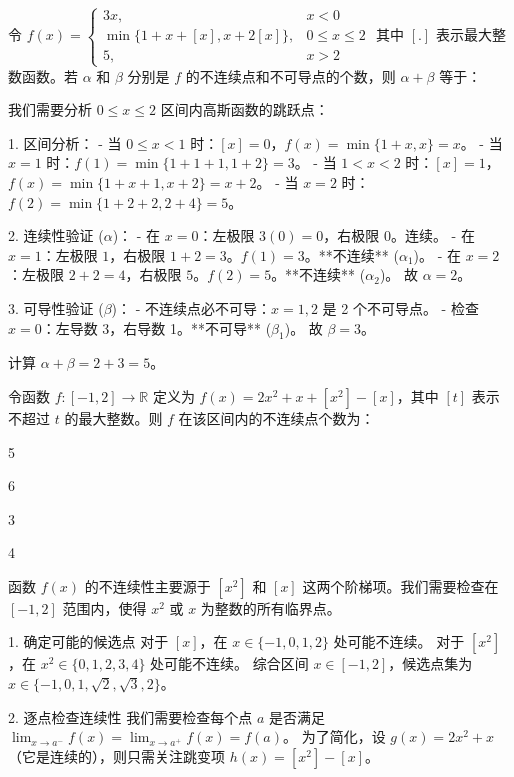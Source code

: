 \begin{questions}
\question 
令 $f(x) = \begin{cases} 3x, & x < 0 \\ \min\{1+x+[x], x+2[x]\}, & 0 \leq x \leq 2 \\ 5, & x > 2 \end{cases}$
其中 $[.]$ 表示最大整数函数。若 $\alpha$ 和 $\beta$ 分别是 $f$ 的不连续点和不可导点的个数，则 $\alpha + \beta$ 等于：

\begin{solution}
我们需要分析 $0 \leq x \leq 2$ 区间内高斯函数的跳跃点：

1. 区间分析：
- 当 $0 \leq x < 1$ 时：$[x]=0$，$f(x) = \min\{1+x, x\} = x$。
- 当 $x = 1$ 时：$f(1) = \min\{1+1+1, 1+2\} = 3$。
- 当 $1 < x < 2$ 时：$[x]=1$，$f(x) = \min\{1+x+1, x+2\} = x+2$。
- 当 $x = 2$ 时：$f(2) = \min\{1+2+2, 2+4\} = 5$。

2. 连续性验证 ($\alpha$)：
- 在 $x=0$：左极限 $3(0)=0$，右极限 $0$。连续。
- 在 $x=1$：左极限 $1$，右极限 $1+2=3$。$f(1)=3$。**不连续** ($\alpha_1$)。
- 在 $x=2$：左极限 $2+2=4$，右极限 $5$。$f(2)=5$。**不连续** ($\alpha_2$)。
故 $\alpha = 2$。

3. 可导性验证 ($\beta$)：
- 不连续点必不可导：$x=1, 2$ 是 2 个不可导点。
- 检查 $x=0$：左导数 3，右导数 1。**不可导** ($\beta_1$)。
故 $\beta = 3$。

计算 $\alpha + \beta = 2 + 3 = 5$。
\end{solution}

\question 
令函数 $f : [-1, 2] \to \mathbb{R}$ 定义为 $f(x) = 2x^2 + x + [x^2] - [x]$，其中 $[t]$ 表示不超过 $t$ 的最大整数。则 $f$ 在该区间内的不连续点个数为：
\begin{choices}
    \item 5
    \item 6
    \item 3
    \item 4
\end{choices}

\begin{solution}
函数 $f(x)$ 的不连续性主要源于 $[x^2]$ 和 $[x]$ 这两个阶梯项。我们需要检查在 $[-1, 2]$ 范围内，使得 $x^2$ 或 $x$ 为整数的所有临界点。

1. 确定可能的候选点
对于 $[x]$，在 $x \in \{-1, 0, 1, 2\}$ 处可能不连续。
对于 $[x^2]$，在 $x^2 \in \{0, 1, 2, 3, 4\}$ 处可能不连续。
综合区间 $x \in [-1, 2]$，候选点集为 $x \in \{-1, 0, 1, \sqrt{2}, \sqrt{3}, 2\}$。

2. 逐点检查连续性
我们需要检查每个点 $a$ 是否满足 $\lim_{x \to a^-} f(x) = \lim_{x \to a^+} f(x) = f(a)$。
为了简化，设 $g(x) = 2x^2 + x$（它是连续的），则只需关注跳变项 $h(x) = [x^2] - [x]$。


\end{solution}
\end{questions}
